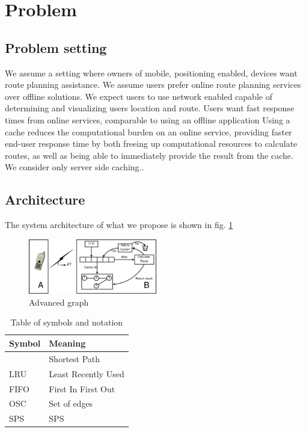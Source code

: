 \section{Problem}\label{sec:problemdef}

\subsection{Problem setting}\label{subsec:probset}
We assume a setting where owners of mobile, positioning enabled, devices want route planning assistance. We assume users prefer online route planning services over offline solutions. 
We expect users to use network enabled capable of determining and visualizing users location and route.
Users want fast response times from online services, comparable to using an offline application \cite{ref}
Using a cache reduces the computational burden \cite{ref} on an online service, providing faster end-user response time \cite{ref} by both freeing up computational resources to calculate \spath routes, as well as being able to immediately provide the \spath result from the cache.
We consider only server side caching..



\subsection{Architecture}

The system architecture of what we propose is shown in fig. \ref{fig:advancedroutequery} 


\begin{figure}
  \center
	\includegraphics[width=0.5\textwidth]{figures/advancedroutequery.pdf}
	\caption{Advanced graph}
  \label{fig:advancedroutequery}
\end{figure}

\begin{table}
\begin{tabular*}{\columnwidth}{|l||p{}|}
\hline
Symbol		& Meaning \\\hline
\spath		& Shortest Path \\\hline
LRU		& Least Recently Used \\\hline
FIFO		& First In First Out \\\hline
OSC		& Set of edges \\\hline
\acs{SPS} 	& \acl{SPS} \\\hline
\end{tabular*}
\caption{Table of symbols and notation} 
\label{tab:symbols}
\end{table}



